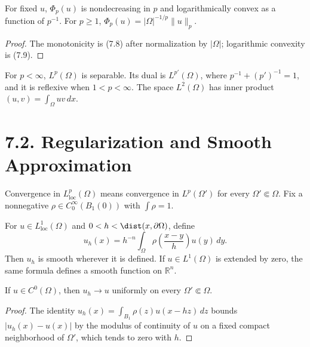 \begin{proposition}
\label{gt:prop-sobolev-normalized-lp-functional}
For fixed $u$, $\Phi_p(u)$ is nondecreasing in $p$ and logarithmically convex
as a function of $p^{-1}$. For $p\geq1$,
$\Phi_p(u)=|\Omega|^{-1/p}\|u\|_p$.
\end{proposition}
\begin{proof}
\sketch The monotonicity is (7.8) after normalization by $|\Omega|$;
logarithmic convexity is (7.9).
\end{proof}

For $p<\infty$, $L^p(\Omega)$ is separable. Its dual is $L^{p'}(\Omega)$,
where $p^{-1}+(p')^{-1}=1$, and it is reflexive when $1<p<\infty$.
The space $L^2(\Omega)$ has inner product
$ (u,v)=\int_\Omega uv\,dx$.

\section*{7.2. Regularization and Smooth Approximation}

Convergence in $L^p_{\mathrm{loc}}(\Omega)$ means convergence in
$L^p(\Omega')$ for every $\Omega'\Subset\Omega$. Fix a nonnegative
$\rho\in C_0^\infty(B_1(0))$ with $\int\rho=1$.

\begin{definition}[Mollification]
\label{gt:def-sobolev-mollification}
For $u\in L^1_{\mathrm{loc}}(\Omega)$ and
$0<h<\dist(x,\partial\Omega)$, define
\begin{equation}
\tag{7.13}
u_h(x)=h^{-n}\int_\Omega
\rho\!\left(\frac{x-y}{h}\right)u(y)\,dy.
\end{equation}
Then $u_h$ is smooth wherever it is defined. If $u\in L^1(\Omega)$ is
extended by zero, the same formula defines a smooth function on $\mathbb R^n$.
\end{definition}

\begin{lemma}
\label{gt:lem-sobolev-regularization-uniform}
If $u\in C^0(\Omega)$, then $u_h\to u$ uniformly on every
$\Omega'\Subset\Omega$.
\end{lemma}
\begin{proof}
\sketch The identity
$u_h(x)=\int_{B_1}\rho(z)u(x-hz)\,dz$ bounds
$|u_h(x)-u(x)|$ by the modulus of continuity of $u$ on a fixed compact
neighborhood of $\Omega'$, which tends to zero with $h$.
\end{proof}

